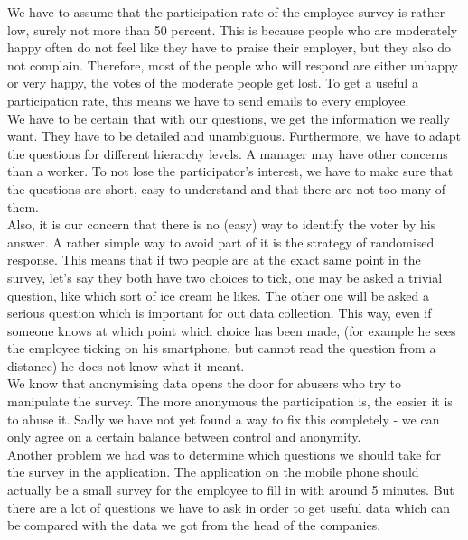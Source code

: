 \documentclass[portrait,a4paper]{article}
\begin{document}
		We have to assume that the participation rate of the employee survey is rather low, 
		surely not more than 50 percent. This is because people who are moderately happy often 
		do not feel like they have to praise their employer, but they also do not complain. 
		Therefore, most of the people who will respond are either unhappy or very happy, 
		the votes of the moderate people get lost. To get a useful a participation rate, 
		this means we have to send emails to every employee.\\
		We have to be certain that with our questions, we get the information we really want. 
		They have to be detailed and unambiguous. Furthermore, we have to adapt the questions for 
		different hierarchy levels. A manager may have other concerns than a worker.
		To not lose the participator's interest, we have to make sure that the questions are short, 
		easy to understand and that there are not too many of them.\\
		
		Also, it is our concern that there is no (easy) way to identify the voter by his answer. 
		A rather simple way to avoid part of it is the strategy of randomised response. 
		This means that if two people are at the exact same point in the survey, let's say they both 
		have two choices to tick, one may be asked a trivial question, like which sort of ice cream he likes. 
		The other one will be asked a serious question which is important for out data collection. 
		This way, even if someone knows at which point which choice has been made, (for example he sees 
		the employee ticking on his smartphone, but cannot read the question from a distance) 
		he does not know what it meant.\\
		We know that anonymising data opens the door for abusers who try to manipulate the survey. 
		The more anonymous the participation is, the easier it is to abuse it. Sadly we have not yet found a 
		way to fix this completely - we can only agree on a certain balance between control and anonymity.\\
		
		Another problem we had was to determine which questions we should take for the survey in the application. 
		The application on the mobile phone should actually be a small survey for the employee to fill in with around 
		5 minutes. But there are a lot of questions we have to ask in order to get useful data which can be 
		compared with the data we got from the head of the companies.\\
		
\end{document}
